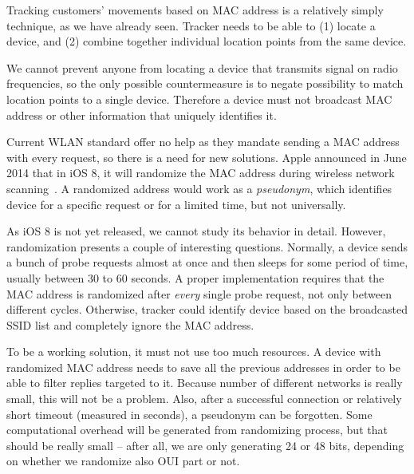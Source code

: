 \documentclass[12pt,a4paper,oneside,pdftex]{report}
\begin{document}
Tracking customers' movements based on MAC address is a relatively simply technique, as we have already seen. Tracker needs to be able to (1) locate a device, and (2) combine together individual location points from the same device.

We cannot prevent anyone from locating a device that transmits signal on radio frequencies, so the only possible countermeasure is to negate possibility to match location points to a single device. Therefore a device must not broadcast MAC address or other information that uniquely identifies it.

Current WLAN standard offer no help as they mandate sending a MAC address with every request, so there is a need for new solutions. Apple announced in June 2014 that in iOS 8, it will randomize the MAC address during wireless network scanning~\cite{FredericJacobs2014,apple_wwdc_privacy}. A randomized address would work as a \emph{pseudonym}, which identifies device for a specific request or for a limited time, but not universally.

As iOS 8 is not yet released, we cannot study its behavior in detail. However, randomization presents a couple of interesting questions. Normally, a device sends a bunch of probe requests almost at once and then sleeps for some period of time, usually between 30 to 60 seconds. A proper implementation requires that the MAC address is randomized after \emph{every} single probe request, not only between different cycles. Otherwise, tracker could identify device based on the broadcasted SSID list and completely ignore the MAC address.

To be a working solution, it must not use too much resources. A device with randomized MAC address needs to save all the previous addresses in order to be able to filter replies targeted to it. Because number of different networks is really small, this will not be a problem. Also, after a successful connection or relatively short timeout (measured in seconds), a pseudonym can be forgotten. Some computational overhead will be generated from randomizing process, but that should be really small -- after all, we are only generating 24 or 48 bits, depending on whether we randomize also OUI part or not.
\end{document}
